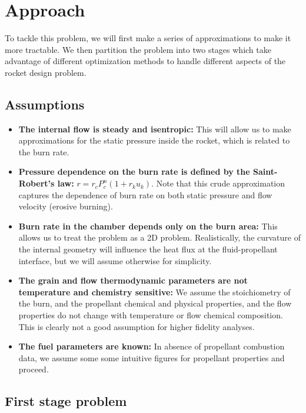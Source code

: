 \section{Approach}

To tackle this problem, we will first make a series of approximations to make it more tractable.
We then partition the problem into two stages which take advantage of different optimization
methods to handle different aspects of the rocket design problem.

\subsection{Assumptions}
\label{sec:assumptions}

\begin{itemize}
	\item \textbf{The internal flow is steady and isentropic:} This will allow us to make approximations for the static pressure inside the rocket,
		which is related to the burn rate.
	\item \textbf{Pressure dependence on the burn rate is defined by the Saint-Robert's law:} $r = r_c P_c^n (1+r_k u_k)$. Note that
		this crude approximation captures the dependence of burn rate on both static pressure and flow velocity (erosive burning).
	\item \textbf{Burn rate in the chamber depends only on the burn area:} This allows us to treat the problem as a 2D problem.
		Realistically, the curvature of the internal geometry will influence the heat flux at the fluid-propellant interface,
		but we will assume otherwise for simplicity.
	\item \textbf{The grain and flow thermodynamic parameters are not temperature and chemistry sensitive:}
		We assume the stoichiometry of the burn, and the propellant
		chemical and physical properties, and the flow properties do not change with temperature or flow chemical composition.
		This is clearly not a good assumption for higher fidelity analyses.
	\item \textbf{The fuel parameters are known:} In absence of propellant combustion data, we assume some
		some intuitive figures for propellant properties and proceed.
\end{itemize}

\subsection{First stage problem}

